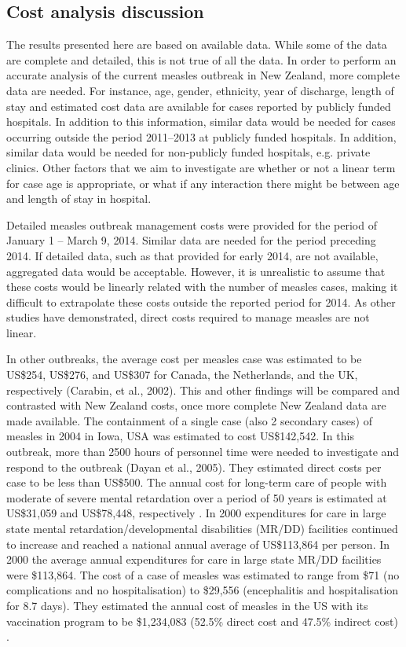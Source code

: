 \documentclass{article}
\begin{document}
\subsection{Cost analysis discussion}
The results presented here are based on available data. While some of the data are complete and detailed, this is not true of all the data. In order to perform an accurate analysis of the current measles outbreak in New Zealand, more complete data are needed. For instance, age, gender, ethnicity, year of discharge, length of stay and estimated cost data are available for cases reported by publicly funded hospitals. In addition to this information, similar data would be needed for cases occurring outside the period 2011--2013 at publicly funded hospitals. In addition, similar data would be needed for non-publicly funded hospitals, e.g. private clinics. Other factors that we aim to investigate are whether or not a linear term for case age is appropriate, or what if any interaction there might be between age and length of stay in hospital.

Detailed measles outbreak management costs were provided for the period of January 1 -- March 9, 2014. Similar data are needed for the period preceding 2014. If detailed data, such as that provided for early 2014, are not available, aggregated data would be acceptable. However, it is unrealistic to assume that these costs would be linearly related with the number of measles cases, making it difficult to extrapolate these costs outside the reported period for 2014. As other studies have demonstrated, direct costs required to manage measles are not linear.

In other outbreaks, the average cost per measles case was estimated to be US\$254, US\$276, and US\$307 for Canada, the Netherlands, and the UK, respectively (Carabin, et al., 2002). This and other findings will be compared and contrasted with New Zealand costs, once more complete New Zealand data are made available.
The containment of a single case (also 2 secondary cases) of measles in 2004 in Iowa, USA was estimated to cost US\$142,542. In this outbreak, more than 2500 hours of personnel time were needed to investigate and respond to the outbreak (Dayan et al., 2005). They estimated direct costs per case to be less than US\$500. 
The annual cost for long-term care of people with moderate of severe mental retardation over a period of 50 years is estimated at US\$31,059 and US\$78,448, respectively \citep{prouty1}. In 2000 expenditures for care in large state mental retardation/developmental disabilities (MR/DD) facilities continued to increase and reached a national annual average of US\$113,864 per person. In 2000 the average annual expenditures for care in large state MR/DD facilities were \$113,864. The cost of a case of measles was estimated to range from \$71 (no complications and no hospitalisation) to \$29,556 (encephalitis and hospitalisation for 8.7 days). They estimated the annual cost of measles in the US with its vaccination program to be \$1,234,083 (52.5\% direct cost and 47.5\% indirect cost) \citep{zhou4}.
\end{document}
